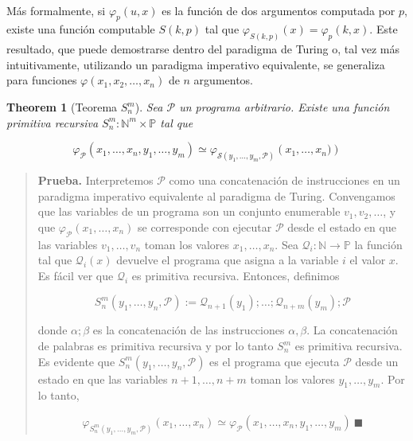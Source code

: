 \documentclass[a4paper, 12pt]{article}
\newtheorem{theorem}{Theorem}
\newtheorem{theorem}{Theorem}
\begin{document}
~

Más formalmente, si $\varphi_p(u, x)$ es la función de dos
argumentos computada por $p$, existe una función computable $S(k, p)$ tal que
$\varphi_{S(k, p)}(x) = \varphi_p(k, x)$. Este resultado, que puede demostrarse
dentro del paradigma de Turing o, tal vez más intuitivamente, utilizando un
paradigma imperativo equivalente, se generaliza para funciones $\varphi(x_1, x_2,
\ldots, x_n)$ de $n$ argumentos. 

\begin{theorem}[Teorema $S_n^m$]
  Sea $\mathcal{P}$ un programa arbitrario. Existe una función primitiva
  recursiva $S_n^m : \mathbb{N}^m \times \mathbb{P}$ tal que 

  \begin{equation*}
    \varphi_\mathcal{P}(x_1, \ldots, x_n, y_1, \ldots, y_m) \simeq
    \varphi_{\mathcal{S}(y_1,\ldots, y_m, \mathcal{P})} \left(
    x_1, \ldots, x_n) \right) 
  \end{equation*}

\end{theorem}


\small
\begin{quote}

\textbf{Prueba.} Interpretemos $\mathcal{P}$ como una concatenación de
instrucciones en un paradigma imperativo equivalente al paradigma de Turing.
Convengamos que las variables de un programa son un
conjunto enumerable $v_1, v_2, \ldots$, y que
$\varphi_\mathcal{P}(x_1,\ldots, x_n)$ se corresponde con ejecutar $\mathcal{P}$
desde el estado en que las variables $v_1, \ldots, v_n$ toman los valores $x_1,
\ldots, x_n$. Sea
$\mathcal{Q}_i : \mathbb{N} \to \mathbb{P}$ la función tal que
$\mathcal{Q}_i(x)$ devuelve el programa que asigna a la variable $i$ el valor
$x$. Es fácil ver que $\mathcal{Q}_i$ es primitiva recursiva. Entonces,
definimos 

\begin{equation*}
  S_n^m(y_1, \ldots, y_n, \mathcal{P}) := \mathcal{Q}_{n+1}(y_1); \ldots;
  \mathcal{Q}_{n+m} (y_m); \mathcal{P}
\end{equation*}

donde $\alpha;\beta$ es la concatenación de las instrucciones $\alpha, \beta$.
La concatenación de palabras es primitiva recursiva y por lo tanto $S_n^m$ es
primitiva recursiva. Es evidente que $S_n^m(y_1, \ldots, y_n, \mathcal{P})$ es el programa
que ejecuta $\mathcal{P}$ desde un estado en que las variables $n+1, \ldots, n+m$ 
toman los valores $y_1, \ldots, y_m$. Por lo tanto, 

\begin{equation*}
  \varphi_{S_n^m(y_1,\ldots, y_m, \mathcal{P})}(x_1,\ldots, x_n) \simeq
  \varphi_{\mathcal{P}}(x_1, \ldots, x_n, y_1, \ldots, y_m) ~ \blacksquare
\end{equation*}



\end{quote}
\normalsize
\end{document}
